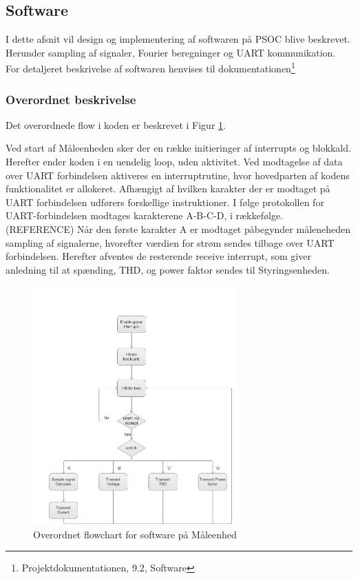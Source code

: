 
\subsection{Software}
I dette afsnit vil design og implementering af softwaren på PSOC blive beskrevet. Herunder sampling af signaler, Fourier beregninger og  UART kommunikation. For detaljeret beskrivelse af softwaren henvises til dokumentationen\footnote{Projektdokumentationen, 9.2, Software}

\subsubsection{Overordnet beskrivelse}
Det overordnede flow i koden er beskrevet i Figur \ref{fig:MEflowchart}. 

Ved start af Måleenheden sker der en række initieringer af interrupts og blokkald. Herefter ender koden i en uendelig loop, uden aktivitet. Ved modtagelse af data over UART forbindelsen aktiveres en interruptrutine, hvor hovedparten af kodens funktionalitet er allokeret. 
Afhængigt af hvilken karakter der er modtaget på UART forbindelsen udførers forskellige instruktioner. I følge protokollen for UART-forbindelsen modtages karakterene A-B-C-D, i rækkefølge. (REFERENCE)
Når den første karakter A er modtaget påbegynder måleneheden sampling af signalerne, hvorefter værdien for strøm sendes tilbage over UART forbindelsen. Herefter afventes de resterende receive interrupt, som giver anledning til at spænding, THD, og power faktor sendes til Styringsenheden. 
\begin{figure}[H] %
	\centering
	\includegraphics[width=0.7\textwidth]{Figure/MEflowchart.png}
	\caption{Overordnet flowchart for software på Måleenhed}
	\label{fig:MEflowchart}
\end{figure}
